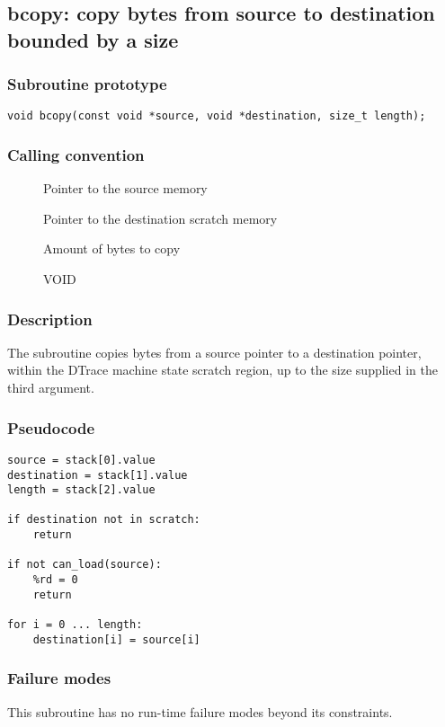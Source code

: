 \clearpage
{}
{}
\label{subr:bcopy}
\subsection*{bcopy: copy bytes from source to destination bounded by a
size}

\subsubsection*{Subroutine prototype}

\begin{verbatim}
void bcopy(const void *source, void *destination, size_t length);
\end{verbatim}

\subsubsection*{Calling convention}

\begin{description}
\item[] Pointer to the source memory
\item[] Pointer to the destination scratch memory
\item[] Amount of bytes to copy
\item[] VOID
\end{description}

\subsubsection*{Description}

The  subroutine copies bytes from a source pointer
to a destination pointer, within the DTrace machine state scratch
region, up to the size supplied in the third argument.
\subsubsection*{Pseudocode}

\begin{verbatim}
source = stack[0].value
destination = stack[1].value
length = stack[2].value

if destination not in scratch:
    return

if not can_load(source):
    %rd = 0
    return

for i = 0 ... length:
    destination[i] = source[i]
\end{verbatim}

\subsubsection*{Failure modes}

This subroutine has no run-time failure modes beyond its constraints.
